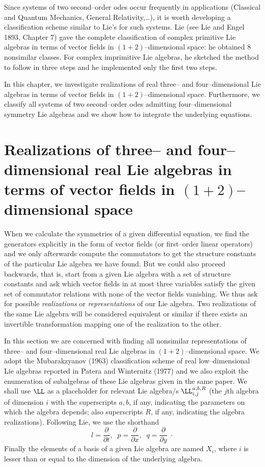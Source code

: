 Since systems of two second--order odes occur frequently in applications
(Classical and Quantum Mechanics, General Relativity,\ldots), it is worth
developing a classification scheme similar to Lie's for such systems.
Lie (see Lie and Engel 1893, Chapter 7) gave the complete classification of complex primitive  Lie
algebras in terms of vector fields in $(1+2)$--dimensional space: he obtained
$8$ nonsimilar classes. For complex imprimitive Lie algebras, he sketched the
method to follow in three steps and he implemented only the first two steps.

In this chapter, we investigate realizations of real three-- and
four--dimensional Lie algebras in terms of vector fields in
$(1+2)$--dimensional space. Furthermore, we classify all systems of
two second--order odes admitting four--dimensional symmetry Lie algebras
and we show  how to integrate the underlying equations. 

\section{Realizations of three-- and four--dimensional real Lie algebras in terms of vector
fields in $(1+2)$--dimensional space}

When we calculate the symmetries
of a given differential equation, we find the generators explicitly in the
form of vector fields (or first--order linear operators) and we only
afterwards compute the commutators to get the structure constants of the
particular Lie algebra we have found. But we could also proceed backwards,
that is, start from a given Lie algebra with a set of structure constants
and ask which vector  fields in at most three variables satisfy the given
set of commutator relations with none of the vector fields vanishing. We
thus ask for possible  {\em realizations} or {\em representations} of our
Lie algebra. Two realizations of the same Lie algebra will be considered
equivalent or similar if there exists an invertible transformation mapping
one of the realization to the other.

In this section we are concerned  with finding all nonsimilar representations
of three-- and
four--dimensional real Lie algebras in $(1+2)$--dimensional space. We
adopt the Mubarakzyanov (1963) classification scheme of  real low--dimensional
Lie algebras reported in Patera and Winternitz (1977) and
we also exploit the enumeration of subalgebras of these Lie algebras given
in the same paper. We shall use $\LL $ as a placeholder for relevant Lie
algebra/s $\LL _{i,j}^{a,b,R}$ (the $j$th algebra of dimension $i$ with
the superscripts $a,b$, if any, indicating  the parameters on which the
algebra
depends; also superscripts $R$, if any, indicating the algebra
realizations). Following Lie, we use the shorthand 
\[l=\frac{\partial}{\partial t},\;\;p=\frac{\partial}{\partial x},
\;\;q=\frac{\partial}{\partial y}\;\cdot\]
Finally the elements of a basis of a
given Lie algebra are named $X_i$, where $i$ is lesser than or equal to
the dimension of the underlying algebra. 

